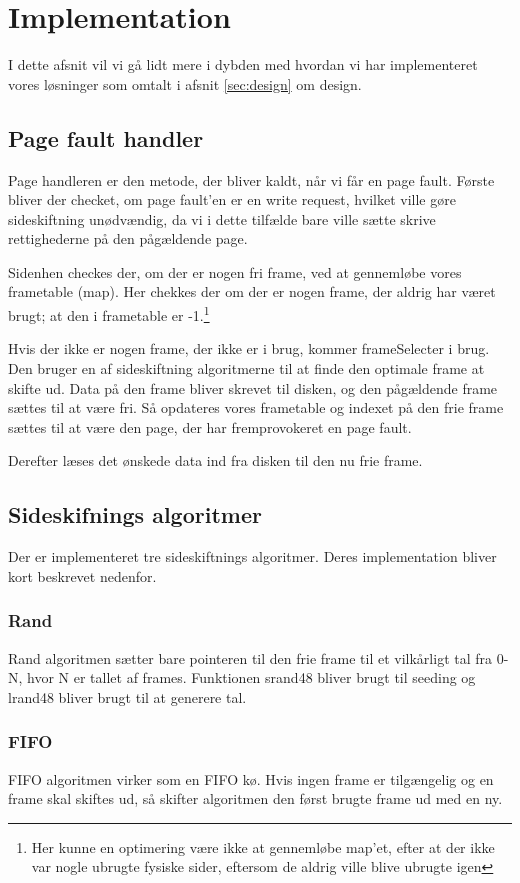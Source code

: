 \section{Implementation}
I dette afsnit vil vi gå lidt mere i dybden med hvordan vi har implementeret vores løsninger som omtalt i afsnit \ref{sec:design} om design.

\subsection{Page fault handler}
Page handleren er den metode, der bliver kaldt, når vi får en page fault. Første bliver der checket, om page fault'en er en write request, hvilket ville gøre sideskiftning unødvændig, da vi i dette tilfælde bare ville sætte skrive rettighederne på den pågældende page.

Sidenhen checkes der, om der er nogen fri frame, ved at gennemløbe vores frametable (map). Her chekkes der om der er nogen frame, der aldrig har været brugt; at den i frametable er -1.\footnote{Her kunne en optimering være ikke at gennemløbe map'et, efter at der ikke var nogle ubrugte fysiske sider, eftersom de aldrig ville blive ubrugte igen}

Hvis der ikke er nogen frame, der ikke er i brug, kommer frameSelecter i brug. Den bruger en af sideskiftning algoritmerne til at finde den optimale frame at skifte ud. Data på den frame bliver skrevet til disken, og den pågældende frame sættes til at være fri. Så opdateres vores frametable og indexet på den frie frame sættes til at være den page, der har fremprovokeret en page fault.

Derefter læses det ønskede data ind fra disken til den nu frie frame.

\subsection{Sideskifnings algoritmer}
Der er implementeret tre sideskiftnings algoritmer. Deres implementation bliver kort beskrevet nedenfor.

\subsubsection*{Rand}
Rand algoritmen sætter bare pointeren til den frie frame til et vilkårligt tal fra 0-N, hvor N er tallet af frames. Funktionen srand48 bliver brugt til seeding og lrand48 bliver brugt til at generere tal.

\subsubsection*{FIFO}
FIFO algoritmen virker som en FIFO kø. Hvis ingen frame er tilgængelig og en frame skal skiftes ud, så skifter algoritmen den først brugte frame ud med en ny.

